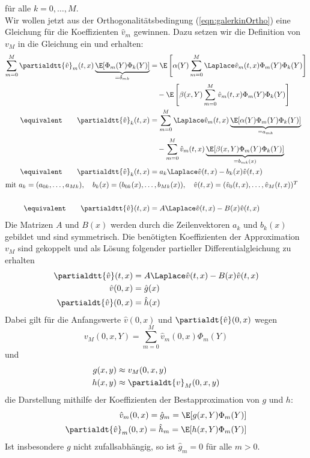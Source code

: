 für alle $k=0,\dots,M$.\\
Wir wollen jetzt aus der Orthogonalitätsbedingung (\ref{eqn:galerkinOrtho}) eine Gleichung für die Koeffizienten $\hat{v}_m$ gewinnen. Dazu setzen wir die Definition von $v_M$ in die Gleichung ein und erhalten:
\begin{align}
\sum_{m=0}^M\partialdtt{\hat{v}}_m(t,x)\underbrace{\E[\Phi_m(Y)\Phi_k(Y)]}_{=\delta_{mk}}&=\E\left[\alpha(Y)\sum_{m=0}^M\Laplace \hat{v}_m(t,x)\Phi_m(Y)\Phi_k(Y)\right]\nonumber\\
&\quad -\E\left[\beta(x,Y)\sum_{m=0}^M\hat{v}_m(t,x)\Phi_m(Y)\Phi_k(Y)\right]\nonumber\\
\equivalent \qquad \partialdtt{\hat{v}}_k(t,x)&=\sum_{m=0}^M\Laplace \hat{v}_m(t,x)\underbrace{\E[\alpha(Y)\Phi_m(Y)\Phi_k(Y)]}_{=a_{mk}}\nonumber\\
&\quad -\sum_{m=0}^M\hat{v}_m(t,x)\underbrace{\E[\beta(x,Y)\Phi_m(Y)\Phi_k(Y)]}_{=b_{mk}(x)}\nonumber\\
\equivalent \qquad \partialdtt{\hat{v}}_k(t,x)&=a_k\Laplace \hat{v}(t,x)-b_k(x)\hat{v}(t,x)\label{eqn:galerkin_def_medium}\\
\intertext{mit $ a_k=(a_{0k},\dots,a_{Mk}),\quad b_k(x)=(b_{0k}(x),\dots,b_{Mk}(x)),\quad \hat{v}(t,x)=(\hat{v}_0(t,x),\dots,\hat{v}_M(t,x))^T$}\nonumber\\
\equivalent \qquad \partialdtt{\hat{v}}(t,x)&=A\Laplace \hat{v}(t,x)-B(x)\hat{v}(t,x)\nonumber
\end{align}
Die Matrizen $A$ und $B(x)$ werden durch die Zeilenvektoren $a_k$ und $b_k(x)$ gebildet und sind symmetrisch. Die benötigten Koeffizienten der Approximation $v_M$ sind gekoppelt und als Lösung folgender partieller Differentialgleichung zu erhalten
\begin{equation}
\label{eqn:galerkin_dgl}
\begin{split}
\partialdtt{\hat{v}}(t,x)&=A\Laplace \hat{v}(t,x)-B(x)\hat{v}(t,x)\\
\hat{v}(0,x)&=\hat{g}(x)\\
\partialdt{\hat{v}}(0,x)&=\hat{h}(x)\\
\end{split}
\end{equation}
Dabei gilt für die Anfangswerte $\hat{v}(0,x)$ und $\partialdt{\hat{v}}(0,x)$ wegen 
\[v_M(0,x,Y)=\sum_{m=0}^M\hat{v}_m(0,x)\Phi_m(Y)\]
und
\begin{align*}
g(x,y)&\approx v_M(0,x,y)\\
h(x,y)&\approx \partialdt{v}_M(0,x,y)
\end{align*}
die Darstellung mithilfe der Koeffizienten der Bestapproximation von $g$ und $h$:
\begin{align*}
\hat{v}_m(0,x)=\hat{g}_m=\E[g(x,Y)\Phi_m(Y)]\\
\partialdt{\hat{v}}_m(0,x)=\hat{h}_m=\E[h(x,Y)\Phi_m(Y)]
\end{align*}
Ist insbesondere $g$ nicht zufallsabhängig, so ist $\hat{g}_m=0$ für alle $m>0$.
